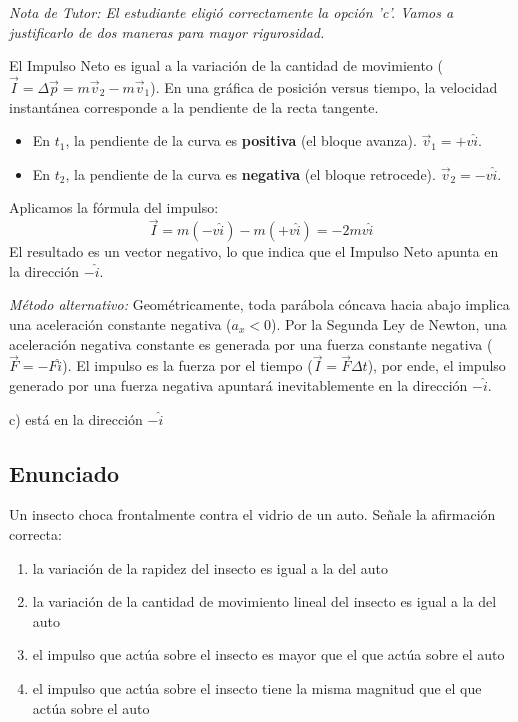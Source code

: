 \documentclass[12pt, a4paper]{article}
\begin{document}
\textit{Nota de Tutor: El estudiante eligió correctamente la opción 'c'. Vamos a justificarlo de dos maneras para mayor rigurosidad.}

El Impulso Neto es igual a la variación de la cantidad de movimiento ($\vec{I} = \Delta\vec{p} = m\vec{v}_2 - m\vec{v}_1$). En una gráfica de posición versus tiempo, la velocidad instantánea corresponde a la pendiente de la recta tangente.
\begin{itemize}
    \item En $t_1$, la pendiente de la curva es \textbf{positiva} (el bloque avanza). $\vec{v}_1 = +v\hat{i}$.
    \item En $t_2$, la pendiente de la curva es \textbf{negativa} (el bloque retrocede). $\vec{v}_2 = -v\hat{i}$.
\end{itemize}
Aplicamos la fórmula del impulso:
$$ \vec{I} = m(-v\hat{i}) - m(+v\hat{i}) = -2mv\hat{i} $$
El resultado es un vector negativo, lo que indica que el Impulso Neto apunta en la dirección $-\hat{i}$.

\textit{Método alternativo:} Geométricamente, toda parábola cóncava hacia abajo implica una aceleración constante negativa ($a_x < 0$). Por la Segunda Ley de Newton, una aceleración negativa constante es generada por una fuerza constante negativa ($\vec{F} = -F\hat{i}$). El impulso es la fuerza por el tiempo ($\vec{I} = \vec{F}\Delta t$), por ende, el impulso generado por una fuerza negativa apuntará inevitablemente en la dirección $-\hat{i}$.

\begin{tcolorbox}[colback=green!5!white, colframe=green!50!black, title=Respuesta Final]
\centering \Large c) está en la dirección $-\hat{i}$
\end{tcolorbox}

\newpage

\subsection*{Enunciado}
Un insecto choca frontalmente contra el vidrio de un auto. Señale la afirmación correcta:
\begin{enumerate}[label=\alph*)]
    \item la variación de la rapidez del insecto es igual a la del auto
    \item la variación de la cantidad de movimiento lineal del insecto es igual a la del auto
    \item el impulso que actúa sobre el insecto es mayor que el que actúa sobre el auto
    \item el impulso que actúa sobre el insecto tiene la misma magnitud que el que actúa sobre el auto
\end{enumerate}
\end{document}
